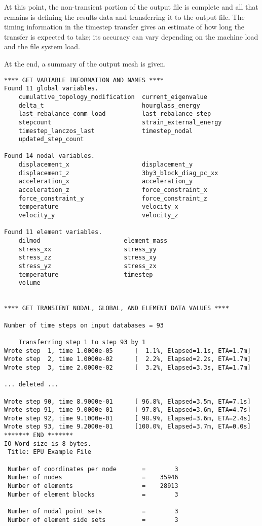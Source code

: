 \sectionline
At this point, the non-transient portion of the output file is
complete and all that remains is defining the results data and
transferring it to the output file.  The timing information in the
timestep transfer gives an estimate of how long the transfer is
expected to take; its accuracy can vary depending on the machine load
and the file system load.  

At the end, a summary of the output mesh is given.

\begin{verbatim}
**** GET VARIABLE INFORMATION AND NAMES ****
Found 11 global variables.
	cumulative_topology_modification  current_eigenvalue                
	delta_t                           hourglass_energy                  
	last_rebalance_comm_load          last_rebalance_step
	stepcount                         strain_external_energy            
	timestep_lanczos_last             timestep_nodal                    
	updated_step_count                

Found 14 nodal variables.
	displacement_x                    displacement_y                    
	displacement_z                    3by3_block_diag_pc_xx             
	acceleration_x                    acceleration_y
	acceleration_z                    force_constraint_x
	force_constraint_y                force_constraint_z
	temperature                       velocity_x                        
	velocity_y                        velocity_z                        

Found 11 element variables.
	dilmod                       element_mass                 
	stress_xx                    stress_yy                    
	stress_zz                    stress_xy                    
	stress_yz                    stress_zx                    
	temperature                  timestep                     
	volume                       


**** GET TRANSIENT NODAL, GLOBAL, AND ELEMENT DATA VALUES ****

Number of time steps on input databases = 93

	Transferring step 1 to step 93 by 1
Wrote step  1, time 1.0000e-05		[  1.1%, Elapsed=1.1s, ETA=1.7m]
Wrote step  2, time 1.0000e-02		[  2.2%, Elapsed=2.2s, ETA=1.7m]
Wrote step  3, time 2.0000e-02		[  3.2%, Elapsed=3.3s, ETA=1.7m]

... deleted ...

Wrote step 90, time 8.9000e-01		[ 96.8%, Elapsed=3.5m, ETA=7.1s]
Wrote step 91, time 9.0000e-01		[ 97.8%, Elapsed=3.6m, ETA=4.7s]
Wrote step 92, time 9.1000e-01		[ 98.9%, Elapsed=3.6m, ETA=2.4s]
Wrote step 93, time 9.2000e-01		[100.0%, Elapsed=3.7m, ETA=0.0s]
******* END *******
IO Word size is 8 bytes.
 Title: EPU Example File

 Number of coordinates per node       =        3
 Number of nodes                      =    35946
 Number of elements                   =    28913
 Number of element blocks             =        3

 Number of nodal point sets           =        3
 Number of element side sets          =        3
\end{verbatim}

